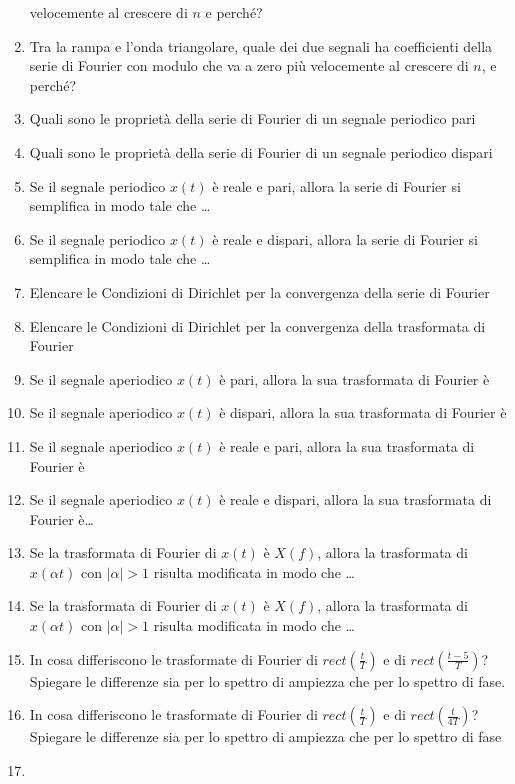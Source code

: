 \documentclass[
  paper=a4,
  ,captions=tableheading
]{scrartcl}
\begin{document}
\begin{enumerate}
  velocemente al crescere di \(n\) e perché?
\item
  Tra la rampa e l'onda triangolare, quale dei due segnali ha
  coefficienti della serie di Fourier con modulo che va a zero più
  velocemente al crescere di \(n\), e perché?
\item
  Quali sono le proprietà della serie di Fourier di un segnale periodico
  pari
\item
  Quali sono le proprietà della serie di Fourier di un segnale periodico
  dispari
\item
  Se il segnale periodico \(x(t)\) è reale e pari, allora la serie di
  Fourier si semplifica in modo tale che \ldots{}
\item
  Se il segnale periodico \(x(t)\) è reale e dispari, allora la serie di
  Fourier si semplifica in modo tale che \ldots{}
\item
  Elencare le Condizioni di Dirichlet per la convergenza della serie di
  Fourier
\item
  Elencare le Condizioni di Dirichlet per la convergenza della
  trasformata di Fourier
\item
  Se il segnale aperiodico \(x(t)\) è pari, allora la sua trasformata di
  Fourier è
\item
  Se il segnale aperiodico \(x(t)\) è dispari, allora la sua trasformata
  di Fourier è
\item
  Se il segnale aperiodico \(x(t)\) è reale e pari, allora la sua
  trasformata di Fourier è
\item
  Se il segnale aperiodico \(x(t)\) è reale e dispari, allora la sua
  trasformata di Fourier è\ldots{}
\item
  Se la trasformata di Fourier di \(x(t)\) è \(X(f)\), allora la
  trasformata di \(x(\alpha t)\) con \(|\alpha| >1\) risulta modificata
  in modo che \ldots{}
\item
  Se la trasformata di Fourier di \(x(t)\) è \(X(f)\), allora la
  trasformata di \(x(\alpha t)\) con \(|\alpha| >1\) risulta modificata
  in modo che \ldots{}
\item
  In cosa differiscono le trasformate di Fourier di
  \(rect (\frac{t}{T})\) e di \(rect (\frac{t-5}{T})\)? Spiegare le
  differenze sia per lo spettro di ampiezza che per lo spettro di fase.
\item
  In cosa differiscono le trasformate di Fourier di
  \(rect(\frac{t}{T})\) e di \(rect(\frac{t}{4T})\)? Spiegare le
  differenze sia per lo spettro di ampiezza che per lo spettro di fase
\item

\end{enumerate}
\end{document}
